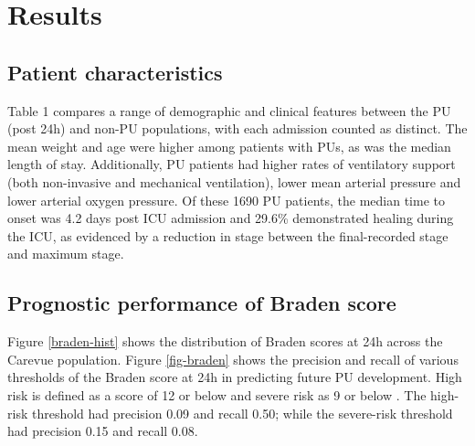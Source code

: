 \documentclass{ws-procs11x85}
\begin{document}
\section{Results}

\subsection{Patient characteristics}
Table 1 compares a range of demographic and clinical features between the PU (post 24h) and non-PU populations, with each admission counted as distinct. The mean weight and age were higher among patients with PUs, as was the median length of stay. Additionally, PU patients had higher rates of ventilatory support (both non-invasive and mechanical ventilation), lower mean arterial pressure and lower arterial oxygen pressure. Of these 1690 PU patients, the median time to onset was 4.2 days post ICU admission and 29.6\% demonstrated healing during the ICU, as evidenced by a reduction in stage between the final-recorded stage and maximum stage. 


\subsection{Prognostic performance of Braden score}
Figure \ref{braden-hist} shows the distribution of Braden scores at 24h across the Carevue population. Figure \ref{fig-braden} shows the precision and recall of various thresholds of the Braden score at 24h in predicting future PU development. High risk is defined as a score of 12 or below and severe risk as 9 or below \cite{braden,braden2}. The high-risk threshold had precision 0.09 and recall 0.50; while the severe-risk threshold had precision 0.15 and recall 0.08. 
\end{document}

